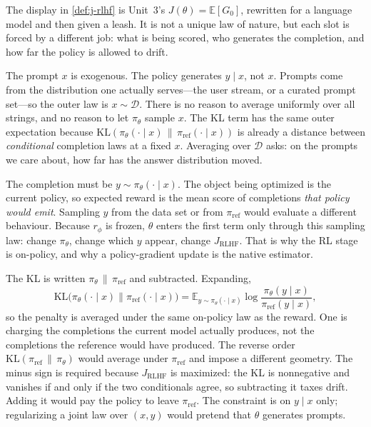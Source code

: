 \documentclass[11pt,a4paper]{article}
\theoremstyle{definition}
\begin{document}
\begin{remark}\label{rem:j-rlhf-shape}
The display in \cref{def:j-rlhf} is Unit~3's $J(\theta)=\mathbb{E}[G_0]$, rewritten for a
language model and then given a leash. It is not a unique law of nature, but each
slot is forced by a different job: what is being scored, who generates the
completion, and how far the policy is allowed to drift.

The prompt $x$ is exogenous. The policy generates $y\mid x$, not $x$. Prompts come
from the distribution one actually serves---the user stream, or a curated prompt
set---so the outer law is $x\sim\mathcal{D}$. There is no reason to average
uniformly over all strings, and no reason to let $\pi_\theta$ sample $x$. The KL
term has the same outer expectation because
$\mathrm{KL}(\pi_\theta(\cdot\mid x)\,\|\,\pi_{\mathrm{ref}}(\cdot\mid x))$ is already
a distance between \emph{conditional} completion laws at a fixed $x$. Averaging over
$\mathcal{D}$ asks: on the prompts we care about, how far has the answer distribution
moved.

The completion must be $y\sim\pi_\theta(\cdot\mid x)$. The object being optimized is
the current policy, so expected reward is the mean score of completions \emph{that
policy would emit}. Sampling $y$ from the data set or from $\pi_{\mathrm{ref}}$ would
evaluate a different behaviour. Because $r_\phi$ is frozen, $\theta$ enters the first
term only through this sampling law: change $\pi_\theta$, change which $y$ appear,
change $J_{\mathrm{RLHF}}$. That is why the RL stage is on-policy, and why a
policy-gradient update is the native estimator.

The KL is written $\pi_\theta\,\|\,\pi_{\mathrm{ref}}$ and subtracted. Expanding,
\[
\mathrm{KL}\bigl(
\pi_\theta(\cdot\mid x)\mathbin{\|}\pi_{\mathrm{ref}}(\cdot\mid x)
\bigr)
=\mathbb{E}_{y\sim\pi_\theta(\cdot\mid x)}
\log\frac{\pi_\theta(y\mid x)}{\pi_{\mathrm{ref}}(y\mid x)},
\]
so the penalty is averaged under the same on-policy law as the reward. One is
charging the completions the current model actually produces, not the completions
the reference would have produced. The reverse order
$\mathrm{KL}(\pi_{\mathrm{ref}}\,\|\,\pi_\theta)$ would average under
$\pi_{\mathrm{ref}}$ and impose a different geometry. The minus sign is required
because $J_{\mathrm{RLHF}}$ is maximized: the KL is nonnegative and vanishes if and
only if the two conditionals agree, so subtracting it taxes drift. Adding it would
pay the policy to leave $\pi_{\mathrm{ref}}$. The constraint is on $y\mid x$ only;
regularizing a joint law over $(x,y)$ would pretend that $\theta$ generates prompts.


\end{remark}
\end{document}
